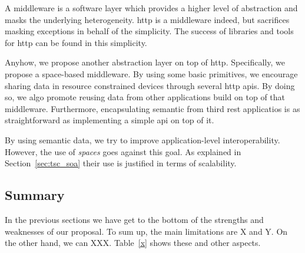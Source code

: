 

A middleware is a software layer which provides a higher level of abstraction and masks the underlying heterogeneity.
\ac{http} is a middleware indeed, but sacrifices masking exceptions in behalf of the simplicity. %
The success of libraries and tools for \ac{http} can be found in this simplicity.

Anyhow, we propose another abstraction layer on top of \ac{http}.
Specifically, we propose a space-based middleware.
By using some basic primitives, we encourage sharing data in resource constrained devices through several \ac{http} \acp{api}.
By doing so, we algo promote reusing data from other applications build on top of that middleware.
Furthermore, encapsulating semantic from third \ac{rest} applicatios is as straightforward as implementing a simple \ac{api} on top of it.

By using semantic data, we try to improve application-level interoperability.
However, the use of \emph{spaces} goes against this goal.
As explained in Section~\ref{sec:tsc_soa} their use is justified in terms of scalability.







\subsection{Summary}

In the previous sections we have get to the bottom of the strengths and weaknesses of our proposal.
To sum up, the main limitations are X and Y.
On the other hand, we can XXX.
Table~\ref{x} shows these and other aspects.

